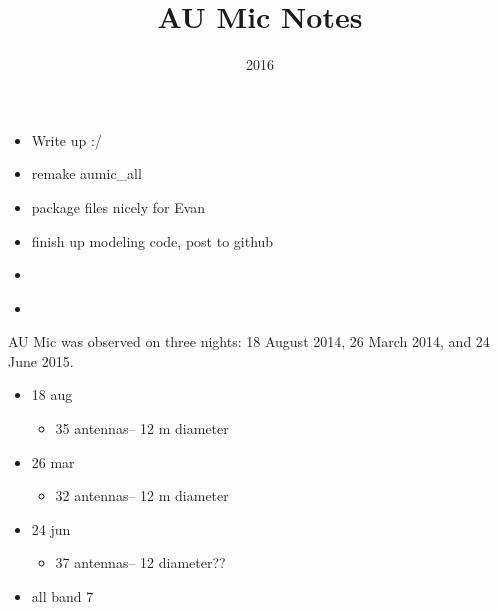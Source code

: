 \documentclass[a4paper]{tufte-handout}
\title{AU Mic Notes}
\date{2016}
\begin{document}
\maketitle


\begin{tasks}
    \begin{itemize}
      \item Write up :/
      \item remake aumic\_all
      \item package files nicely for Evan
      \item finish up modeling code, post to github
    \end{itemize}
\end{tasks}


\begin{maybe}
    \begin{itemize}
      \item
    \end{itemize}
\end{maybe}


\begin{mer}
    \begin{itemize}
      \item
    \end{itemize}

\end{mer}

AU Mic was observed on three nights: 18 August 2014, 26 March 2014, and 24 June 2015.
\begin{itemize}
  \item 18 aug
  \begin{itemize}
    \item 35 antennas-- 12 m diameter
  \end{itemize}

  \item 26 mar
  \begin{itemize}
    \item 32 antennas-- 12 m diameter
  \end{itemize}

  \item 24 jun
  \begin{itemize}
    \item 37 antennas-- 12 diameter??
  \end{itemize}

  \item all band 7

\end{itemize}
\end{document}
